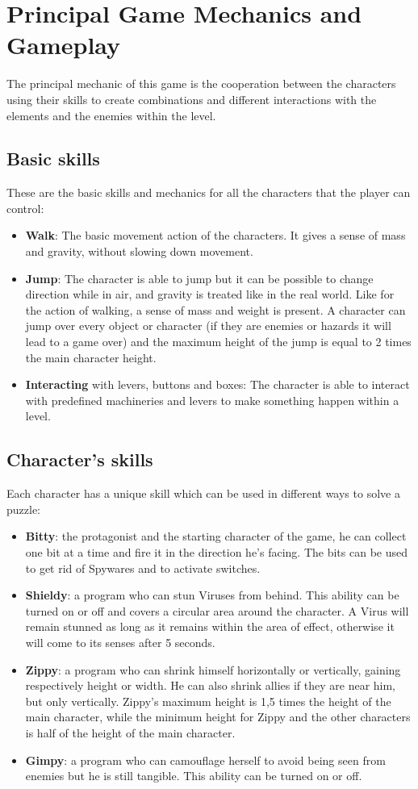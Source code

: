 \documentclass[12pt, a4paper]{report}
\begin{document}
\chapter{Principal Game Mechanics and Gameplay}
The principal mechanic of this game is the cooperation between the characters using their skills to create combinations and different interactions with the elements and the enemies within the level.

\section*{Basic skills}
These are the basic skills and mechanics for all the characters that the player can control:
\begin{itemize}
	\item \textbf{Walk}: The basic movement action of the characters. It gives a sense of mass and gravity, without slowing down movement.
	\item \textbf{Jump}: The character is able to jump but it can be possible to change direction while in air, and gravity is treated like in the real world. Like for the action of walking, a sense of mass and weight is present. A character can jump over every object or character (if they are enemies or hazards it will lead to a game over) and the maximum height of the jump is equal to 2 times the main character height.
	\item \textbf{Interacting} with levers, buttons and boxes: The character is able to interact with predefined machineries and levers to make something happen within a level.
\end{itemize}


\section*{Character’s skills}
Each character has a unique skill which can be used in different ways to solve a puzzle:
\begin{itemize}
	\item \textbf{Bitty}: the protagonist and the starting character of the game, he can collect one bit at a time and fire it in the direction he’s facing. The bits can be used to get rid of Spywares and to activate switches.
	\item \textbf{Shieldy}: a program who can stun Viruses from behind. This ability can be turned on or off and covers a circular area around the 				character. A Virus will remain stunned as long as it remains within the area of effect, otherwise it will come to its senses after 5 seconds.
	\item \textbf{Zippy}:  a program who can shrink himself horizontally or vertically, gaining respectively height or width. He can also shrink allies if they are near him, but only vertically. Zippy's maximum height is 1,5 times the height of the main character, while the minimum height for Zippy and the other characters is half of the height of the main character.
	\item \textbf{Gimpy}: a program who can camouflage herself to avoid being seen from enemies but he is still tangible. This ability can be turned on or off.
\end{itemize}
\end{document}

